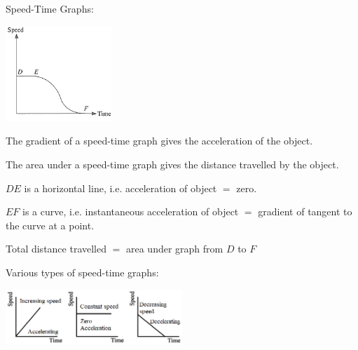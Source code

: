\documentclass[twocolumn]{article}
\begin{document}
\begin{enumerate}
\bigskip 

\bigskip 

\noindent 
Speed-Time Graphs:

\includegraphics[width=0.3\textwidth]{14.png}

\noindent 
The gradient of a speed-time graph gives the acceleration of the object.

\noindent 
The area under a speed-time graph gives the distance travelled by the object.

\noindent 
$D E$ is a horizontal line, i.e. acceleration of object $=$ zero.

\noindent 
$E F$ is a curve, i.e. instantaneous acceleration of object $=$ gradient of tangent to the curve at a point.

\noindent 
Total distance travelled $=$ area under graph from $D$ to $F$

\bigskip

\noindent
Various types of speed-time graphs:

\includegraphics[width=0.5\textwidth]{18.png}



\end{enumerate}
\end{document}
